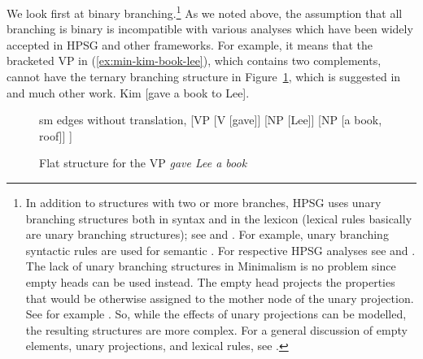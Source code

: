 \documentclass[output=paper
                ,modfonts
                ,nonflat
	        ,collection
	        ,collectionchapter
	        ,collectiontoclongg
 	        ,biblatex
                ,babelshorthands
                ,newtxmath
                ,draftmode
                ,colorlinks, citecolor=brown
]{./langsci/langscibook}
\begin{document}
We look first at binary branching.\footnote{
  In addition to structures with two or more branches, HPSG uses unary branching structures both in syntax
  and in the lexicon (lexical rules basically are unary branching structures); see
  \citet{Meurers2001a} and .
  For example, unary branching syntactic rules are used for semantic 
  \citep{Partee87a-u}. For respective HPSG analyses see  and
  . The lack of unary branching structures in Minimalism is
  no problem since empty heads can be used instead. The empty head projects the
  properties that would be otherwise assigned to the mother node of the unary projection. See for
  example . So, while the effects of unary projections can be
  modelled, the resulting structures are more complex. For a general discussion of empty elements,
  unary projections, and lexical rules, see .
% 
} As we noted above, the assumption that all branching is binary is incompatible with various
analyses which have been widely accepted in HPSG and other frameworks. For example, it means that
the bracketed VP in (\ref{ex:min-kim-book-lee}), which contains two complements, cannot have the
ternary branching structure in Figure~\ref{fig:gave-lee-book}, which is suggested in  and much other work.
\ea
Kim [gave a book to Lee].\label{ex:min-kim-book-lee}
\z
\begin{figure}
	\centering
	\begin{forest} sm edges without translation, 
		[VP
		[V [gave]] [NP [Lee]] [NP [a book, roof]]
		]
	\end{forest}
	\caption{\label{fig:gave-lee-book}Flat structure for the VP \emph{gave Lee a book}}
\end{figure}
\end{document}
